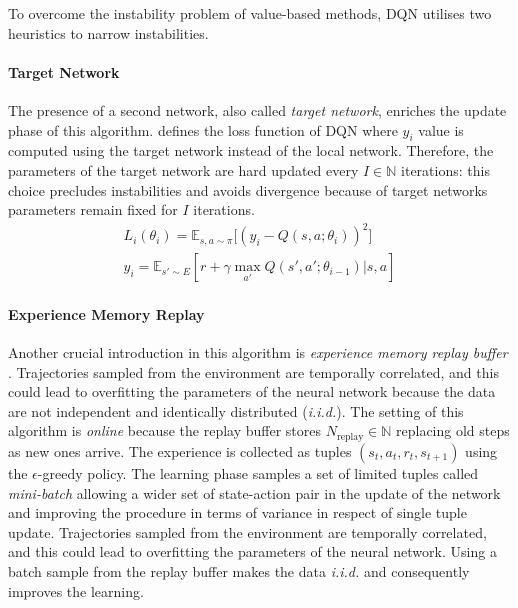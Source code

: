 To overcome the instability problem of value-based methods, DQN utilises two heuristics to narrow instabilities.

\paragraph{Target Network}
The presence of a second network, also called  \textit{target network}, enriches the update phase of this algorithm. 
defines the loss function of DQN where $y_i$ value is computed using the target network instead of the local network. Therefore, the parameters of the target network are hard updated every $I \in \mathbb{N}$ iterations: this choice precludes instabilities and avoids divergence because of target networks parameters remain fixed for $I$ iterations.
\begin{equation} \label{eq:lossdqn}
	\begin{gathered}
		L_i(\theta_i) = \mathbb{E}_{s, a \sim \pi}\big[(y_i - Q(s, a; \theta_i))^2\big]\\
		y_i = \mathbb{E}_{s' \sim E}[r + \gamma \max_{a'}Q(s',a'; \theta_{i-1})|s,a]
	\end{gathered}
\end{equation}

\paragraph{Experience Memory Replay} \label{experience}

Another crucial introduction in this algorithm is \textit{experience memory replay buffer} \cite{lin1992self}. Trajectories sampled from the environment are temporally correlated, and this could lead to overfitting the parameters of the neural network because the data are not independent and identically distributed (\textit{i.i.d.}). The setting of this algorithm is \textit{online} because the replay buffer stores $N_{\text{replay}} \in \mathbb{N}$ replacing old steps as new ones arrive. The experience is collected as tuples $(s_t,a_t,r_t,s_{t+1})$ using the $\epsilon$-greedy policy. The learning phase samples a set of limited tuples called \textit{mini-batch} allowing a wider set of state-action pair in the update of the network and improving the procedure in terms of variance in respect of single tuple update.
Trajectories sampled from the environment are temporally correlated, and this could lead to overfitting the parameters of the neural network. Using a batch sample from the replay buffer makes the data \textit{i.i.d.} and consequently improves the learning.

